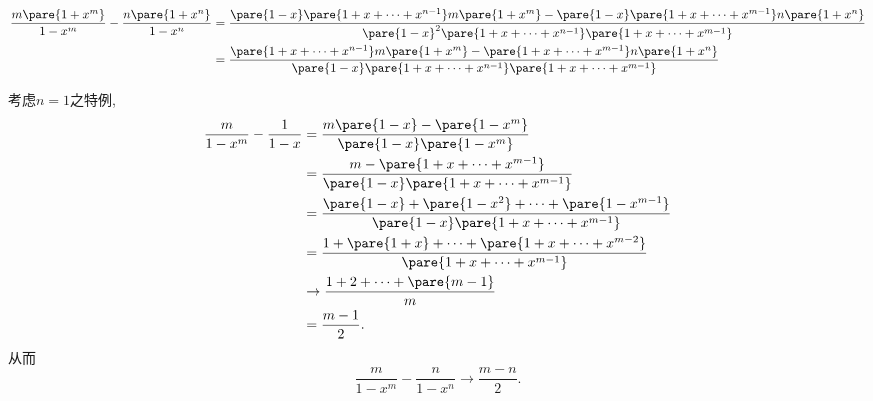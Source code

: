 \documentclass{ctexart}
\begin{document}
\begin{align*}
    \frac{m\pare{1+x^m}}{1-x^m} - \frac{n\pare{1+x^n}}{1-x^n} &= \frac{\pare{1-x}\pare{1+x+\cdots +x^{n-1}}m\pare{1+x^m} - \pare{1-x}\pare{1+x+\cdots +x^{m-1}}n\pare{1+x^n}}{\pare{1-x}^2\pare{1+x+\cdots+x^{n-1}}\pare{1+x+\cdots+x^{m-1}}} \\
    &= \frac{\pare{1+x+\cdots +x^{n-1}}m\pare{1+x^m} - \pare{1+x+\cdots +x^{m-1}}n\pare{1+x^n}}{\pare{1-x}\pare{1+x+\cdots+x^{n-1}}\pare{1+x+\cdots+x^{m-1}}}
\end{align*}

\par
考虑$n=1$之特例,
\begin{align*}
    \frac{m}{1-x^m} - \frac{1}{1-x} &= \frac{m\pare{1-x} - \pare{1-x^m}}{\pare{1-x}\pare{1-x^m}} \\
    &= \frac{m - \pare{1+x+\cdots+x^{m-1}}}{\pare{1-x}\pare{1+x+\cdots+x^{m-1}}} \\
    &= \frac{\pare{1-x} + \pare{1-x^2}+\cdots + \pare{1-x^{m-1}}}{\pare{1-x}\pare{1+x+\cdots+x^{m-1}}} \\
    &= \frac{{1+\pare{1+x} + \cdots + \pare{1+x+\cdots+x^{m-2}}}}{\pare{1+x+\cdots+x^{m-1}}} \\
    &\rightarrow \frac{1+2+\cdots + \pare{m-1}}{m} \\
    &= \frac{m-1}{2}.
\end{align*}
从而
\[ \frac{m}{1-x^m} - \frac{n}{1-x^n}\rightarrow \frac{m-n}{2}. \]
\end{document}
